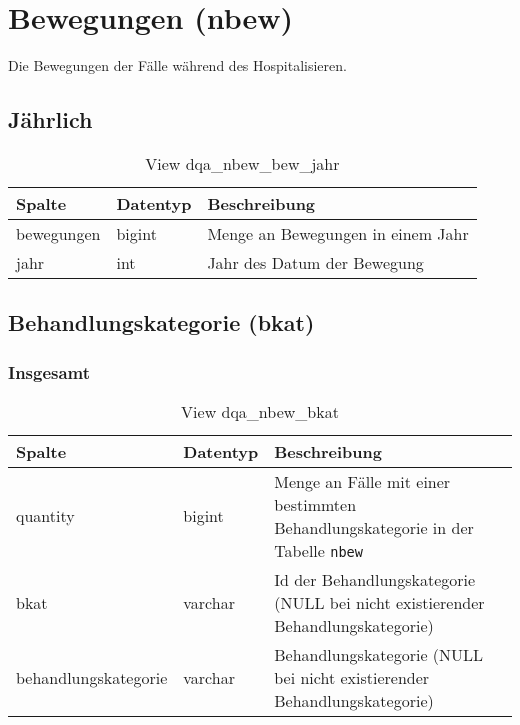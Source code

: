 \chapter{Bewegungen (nbew)} \label{sec:beweg}

Die Bewegungen der Fälle während des Hospitalisieren.

\section{Jährlich} \label{subsubsec:bewJahr}

\begin{table}[ht]
	\centering   
	\caption{View dqa\_nbew\_bew\_jahr}
	\label{tab:beweJahr}
	\begin{tabular}{||l|l|p{10cm}||}   		
		\hline
		Spalte & Datentyp & Beschreibung \\ [0.5ex]
		\hline\hline
		bewegungen & bigint & Menge an Bewegungen in einem Jahr\\
		\hline
		jahr & int &  Jahr des Datum der Bewegung \\
		\hline
		
	\end{tabular}
\end{table}

\section{Behandlungskategorie (bkat)} \label{subsec:behKat}

\subsection{Insgesamt} \label{subsubsec:behKatI}

\begin{table}[ht]
	\centering   
	\caption{View dqa\_nbew\_bkat}
	\label{tab:beweBkatAll}
	\begin{tabular}{||l|l|p{10cm}||}   		
		\hline
		Spalte & Datentyp & Beschreibung \\ [0.5ex]
		\hline\hline
		quantity & bigint & Menge an Fälle mit einer bestimmten Behandlungskategorie in der Tabelle \texttt{nbew} \\
		\hline
		bkat & varchar & Id der Behandlungskategorie (NULL bei nicht existierender Behandlungskategorie)\\
		\hline
		behandlungskategorie & varchar & Behandlungskategorie (NULL bei nicht existierender Behandlungskategorie)\\
		\hline
		
	\end{tabular}
\end{table}
\newpage
